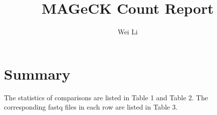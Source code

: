 \documentclass{article}
\begin{document}

\title{MAGeCK Count Report}
\author{Wei Li}

\maketitle


\tableofcontents

\section{Summary}



The statistics of comparisons are listed in Table 1 and Table 2.
The corresponding fastq files in each row are listed in Table 3.
\end{document}
